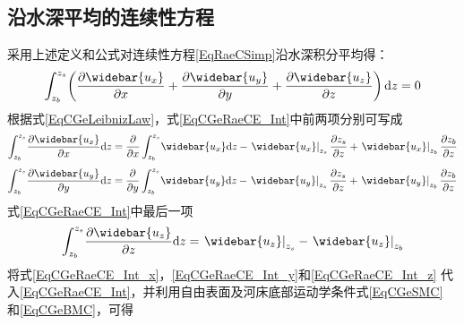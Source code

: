 \subsection{沿水深平均的连续性方程}
采用上述定义和公式对连续性方程\eqref{EqRaeCSimp}沿水深积分平均得：
\begin{equation}
  \int_{z_{b}}^{ z_{s}}\!
  \left(
  \frac{\partial \widebar{u_{x}}}{\partial x} +
  \frac{\partial \widebar{u_{y}}}{\partial y} +
  \frac{\partial \widebar{u_{z}}}{\partial z} 
  \right)
  \mathrm{d}z
  =
  0
  \label{EqCGeRaeCE_Int}
\end{equation}
根据式\eqref{EqCGeLeibnizLaw}，式\eqref{EqCGeRaeCE_Int}中前两项分别可写成
\begin{equation}
  \int_{z_{b}}^{ z_{s}}\!
  \frac{\partial \widebar{u_{x}}}{\partial x} 
  \mathrm{d}z
  =
  \frac{\partial}{\partial x}
  \int_{z_{b}}^{ z_{s}}\!
  \widebar{u_{x}}
  \mathrm{d}z
  -
  \left.\widebar{u_{x}}\right|_{z_{s}}
    \frac{\partial z_{s}}{\partial z}
  +
  \left.\widebar{u_{x}}\right|_{z_{b}}
    \frac{\partial z_{b}}{\partial z}
\label{EqCGeRaeCE_Int_x}
\end{equation}
\begin{equation}
  \int_{z_{b}}^{ z_{s}}\!
  \frac{\partial \widebar{u_{y}}}{\partial y} 
  \mathrm{d}z
  =
  \frac{\partial}{\partial y}
  \int_{z_{b}}^{ z_{s}}\!
  \widebar{u_{y}}
  \mathrm{d}z
  -
  \left.\widebar{u_{y}}\right|_{z_{s}}
    \frac{\partial z_{s}}{\partial z}
  +
  \left.\widebar{u_{y}}\right|_{z_{b}}
    \frac{\partial z_{b}}{\partial z}
\label{EqCGeRaeCE_Int_y}
\end{equation}
式\eqref{EqCGeRaeCE_Int}中最后一项
\begin{equation}
  \int_{z_{b}}^{ z_{s}}\!
  \frac{\partial \widebar{u_{z}}}{\partial z} 
  \mathrm{d}z
  =
  \left.\widebar{u_{z}}\right|_{z_{s}}
    -
    \left.\widebar{u_{z}}\right|_{z_{b}}
\label{EqCGeRaeCE_Int_z}
\end{equation}
将式\eqref{EqCGeRaeCE_Int_x}，\eqref{EqCGeRaeCE_Int_y}和\eqref{EqCGeRaeCE_Int_z}
代入\eqref{EqCGeRaeCE_Int}，并利用自由表面及河床底部运动学条件式\eqref{EqCGeSMC}
和\eqref{EqCGeBMC}，可得
